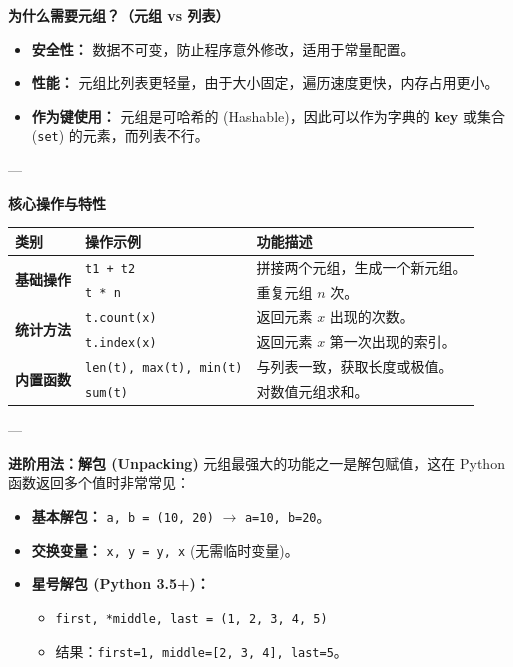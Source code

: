 \documentclass{article}
\begin{document}
\textbf{为什么需要元组？（元组 vs 列表）}

\begin{itemize}
    \item \textbf{安全性：} 数据不可变，防止程序意外修改，适用于常量配置。
    \item \textbf{性能：} 元组比列表更轻量，由于大小固定，遍历速度更快，内存占用更小。
    \item \textbf{作为键使用：} 元组是可哈希的 (Hashable)，因此可以作为字典的 \textbf{key} 或集合 (\texttt{set}) 的元素，而列表不行。
\end{itemize}

---

\textbf{核心操作与特性}
\begin{table}[h]
\centering
\renewcommand{\arraystretch}{1.3}
\begin{tabular}{|l|l|p{8cm}|}
\hline
\textbf{类别} & \textbf{操作示例} & \textbf{功能描述} \\ \hline
\multirow{2}{*}{\textbf{基础操作}} & \texttt{t1 + t2} & 拼接两个元组，生成一个新元组。 \\ \cline{2-3} 
 & \texttt{t * n} & 重复元组 $n$ 次。 \\ \hline
\multirow{2}{*}{\textbf{统计方法}} & \texttt{t.count(x)} & 返回元素 $x$ 出现的次数。 \\ \cline{2-3} 
 & \texttt{t.index(x)} & 返回元素 $x$ 第一次出现的索引。 \\ \hline
\multirow{2}{*}{\textbf{内置函数}} & \texttt{len(t), max(t), min(t)} & 与列表一致，获取长度或极值。 \\ \cline{2-3} 
 & \texttt{sum(t)} & 对数值元组求和。 \\ \hline
\end{tabular}
\end{table}

---

\textbf{进阶用法：解包 (Unpacking)}
元组最强大的功能之一是解包赋值，这在 Python 函数返回多个值时非常常见：
\begin{itemize}
    \item \textbf{基本解包：} \texttt{a, b = (10, 20)} $\rightarrow$ \texttt{a=10, b=20}。
    \item \textbf{交换变量：} \texttt{x, y = y, x} (无需临时变量)。
    \item \textbf{星号解包 (Python 3.5+)：}
    \begin{itemize}
        \item \texttt{first, *middle, last = (1, 2, 3, 4, 5)}
        \item 结果：\texttt{first=1, middle=[2, 3, 4], last=5}。
    \end{itemize}
\end{itemize}
\end{document}
